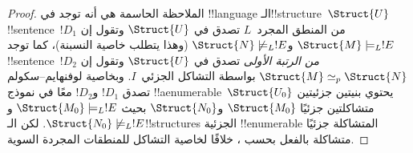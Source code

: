 \documentclass[../../../include/open-logic-section]{subfiles}
\begin{document}
\begin{proof}
الملاحظة الحاسمة هي أنه توجد في !!{language} الـ!!{structure}~$\Struct{U}$
!!{sentence}~$!D_1$ من المنطق المجرد~$L$ تصدق في $\Struct{U}$ وتقول إن
$\Struct{M} \models_L !E$ و$\Struct{N} \not\models_L !E$ (وهذا يتطلب
خاصية النسبنة)، كما توجد !!{sentence}~$!D_2$ \emph{من الرتبة الأولى}
تصدق في $\Struct{U}$ وتقول إن $\Struct{M} \simeq_p \Struct{N}$ بواسطة
التشاكل الجزئي~$I$. وبخاصية لوفنهايم--سكولم تصدق $!D_1$ و$!D_2$ معًا
في نموذج !!a{enumerable}~$\Struct{U_0}$ يحتوي بنيتين جزئيتين متشاكلتين
جزئيًا $\Struct{M_0}$ و$\Struct{N_0}$ بحيث
$\Struct{M_0} \models_L !E$ و$\Struct{N_0} \not\models_L !E$. لكن
الـ!!{structure}s الجزئية !!{enumerable} المتشاكلة جزئيًا متشاكلة بالفعل
بحسب ، خلافًا لخاصية التشاكل للمنطقات
المجردة السوية.
\end{proof}
\end{document}
